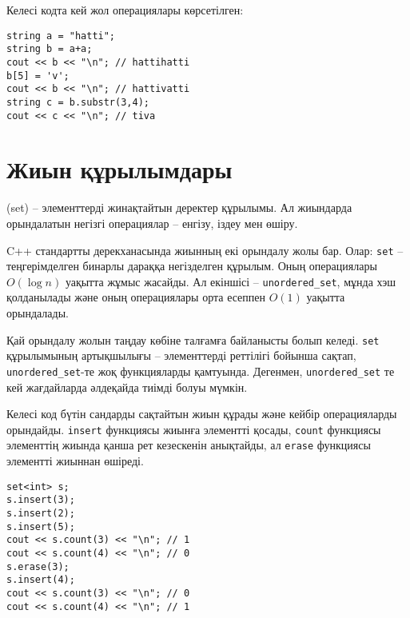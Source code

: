 Келесі кодта кей жол операциялары көрсетілген:

\begin{lstlisting}
string a = "hatti";
string b = a+a;
cout << b << "\n"; // hattihatti
b[5] = 'v';
cout << b << "\n"; // hattivatti
string c = b.substr(3,4);
cout << c << "\n"; // tiva
\end{lstlisting}

\section{Жиын құрылымдары}


 (set) -- элементтерді жинақтайтын деректер 
құрылымы. Ал жиындарда орындалатын негізгі операциялар --
енгізу, іздеу мен өшіру.

C++ стандартты дерекханасында жиынның екі
орындалу жолы бар. Олар:
\texttt{set} -- теңгерімделген бинарлы дараққа негізделген құрылым. Оның
операциялары $O(\log n)$ уақытта жұмыс жасайды. Ал екіншісі --
\texttt{unordered\_set}, мұнда хэш қолданылады және оның операциялары
орта есеппен $O(1)$ уақытта орындалады.

Қай орындалу жолын таңдау көбіне талғамға байланысты болып келеді.
\texttt{set} құрылымының артықшылығы -- элементтерді реттілігі бойынша сақтап,
\texttt{unordered\_set}-те жоқ функцияларды қамтуында.
Дегенмен, \texttt{unordered\_set} те кей жағдайларда әлдеқайда тиімді болуы мүмкін.

Келесі код бүтін сандарды сақтайтын жиын құрады
және кейбір операцияларды орындайды.
\texttt{insert} функциясы жиынға элементті қосады,
\texttt{count} функциясы элементтің жиында қанша рет кезескенін анықтайды,
ал \texttt{erase} функциясы элементті жиыннан өшіреді.

\begin{lstlisting}
set<int> s;
s.insert(3);
s.insert(2);
s.insert(5);
cout << s.count(3) << "\n"; // 1
cout << s.count(4) << "\n"; // 0
s.erase(3);
s.insert(4);
cout << s.count(3) << "\n"; // 0
cout << s.count(4) << "\n"; // 1
\end{lstlisting}

